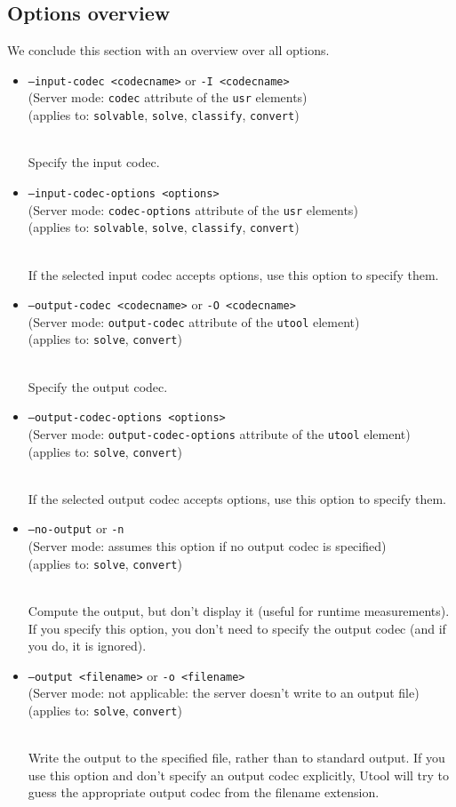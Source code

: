 \cite{koller06,koller06:_towar}




\subsection{Options overview}

We conclude this section with an overview over all options.

\newcommand{\optiondesc}[4]{\item #1 \\ (Server mode: #2) \\
(applies to: #3) \\ \strut\\ #4}

\begin{itemize}
\optiondesc
{\texttt{--input-codec <codecname>} or \texttt{-I <codecname>}}
{\texttt{codec} attribute of the \texttt{usr} elements}
{\texttt{solvable}, \texttt{solve}, \texttt{classify}, \texttt{convert}}
{Specify the input codec.}

\optiondesc{\texttt{--input-codec-options <options>}}
{\texttt{codec-options} attribute of the \texttt{usr} elements}
{\texttt{solvable}, \texttt{solve}, \texttt{classify}, \texttt{convert}}
{If the selected input codec accepts options, use this option to
specify them.}

\optiondesc{\texttt{--output-codec <codecname>} or \texttt{-O <codecname>}}
{\texttt{output-codec} attribute of the \texttt{utool} element}
{\texttt{solve}, \texttt{convert}}
{Specify the output codec.}

\optiondesc{\texttt{--output-codec-options <options>}}
{\texttt{output-codec-options} attribute of the \texttt{utool} element}
{\texttt{solve}, \texttt{convert}}
{If the selected output codec accepts options, use this option to
specify them.}

\optiondesc{\texttt{--no-output} or \texttt{-n}}
{assumes this option if no output codec is specified}
{\texttt{solve}, \texttt{convert}}
{Compute the output, but don't display it (useful for runtime
measurements). If you specify this option, you don't need to specify
the output codec (and if you do, it is ignored). }

\optiondesc{\texttt{--output <filename>} or \texttt{-o <filename>}}
{not applicable: the server doesn't write to an output file}
{\texttt{solve}, \texttt{convert}}
{Write the output to the specified file, rather than to standard
output. If you use this option and don't specify an output codec
explicitly, Utool will try to guess the appropriate output codec from
the filename extension.}





\end{itemize}
